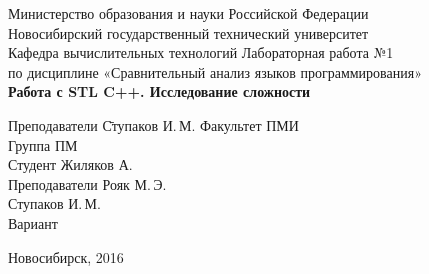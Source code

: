 \begin{titlepage}
    \begin{center}
        Министерство образования и науки Российской Федерации\\
        Новосибирский государственный технический университет\\
        Кафедра вычислительных технологий
        \vfill
        \Large
        Лабораторная работа №1\\ 
        по дисциплине «Сравнительный анализ языков программирования»\\
        \Huge
        \textbf{Работа с STL C++. Исследование сложности}
    \end{center}

    \vfill

    \begin{tabbing}
        Преподаватели \quad\= Ступаков И.\,М.\kill
        Факультет \> ПМИ\\
        Группа \> ПМ\\
        Студент \> Жиляков А.\\
        Преподаватели \> Рояк М.\,Э.\\
                      \> Ступаков И.\,М.\\
        Вариант 
    \end{tabbing}

    \vfill

    \begin{center}
        Новосибирск, 2016
    \end{center}
\end{titlepage} 